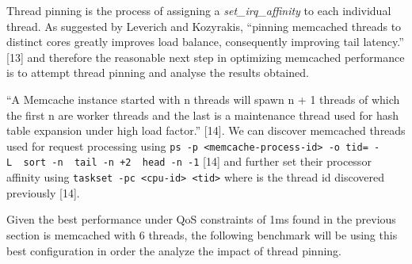 Thread pinning is the process of assigning a \emph{set\_irq\_affinity}
to each individual thread. As suggested by Leverich and Kozyrakis,
``pinning memcached threads to distinct cores greatly improves load
balance, consequently improving tail latency.'' {[}13{]} and therefore
the reasonable next step in optimizing memcached performance is to
attempt thread pinning and analyse the results obtained.

``A Memcache instance started with n threads will spawn n + 1 threads of
which the first n are worker threads and the last is a maintenance
thread used for hash table expansion under high load factor.'' {[}14{]}.
We can discover memcached threads used for request processing using
\texttt{ps\ -p\ \textless{}memcache-process-id\textgreater{}\ -o\ tid=\ -L\ \textbar{}\ sort\ -n\ \textbar{}\ tail\ -n\ +2\ \textbar{}\ head\ -n\ -1}
{[}14{]} and further set their processor affinity using
\texttt{taskset\ -pc\ \textless{}cpu-id\textgreater{}\ \textless{}tid\textgreater{}}
where \emph{} is the thread id discovered previously {[}14{]}.

Given the best performance under QoS constraints of 1ms found in the
previous section is memcached with 6 threads, the following benchmark
will be using this best configuration in order the analyze the impact of
thread pinning.

~

